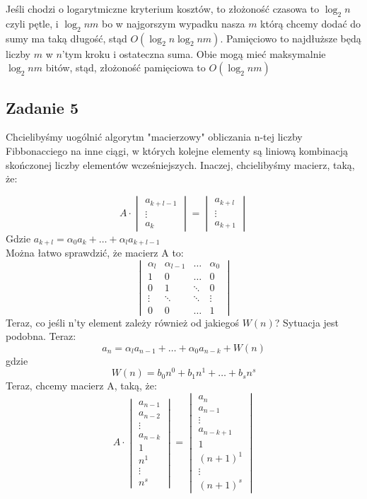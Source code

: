 \documentclass[a4paper]{article}
\begin{document}
Jeśli chodzi o logarytmiczne kryterium kosztów, to złożoność czasowa to $\log_2{n}$ czyli pętle, i $\log_2{nm}$ bo w najgorszym wypadku nasza $m$ którą chcemy dodać do sumy ma taką długość, stąd $O(\log_2{n} \log_2{nm})$. Pamięciowo to najdłuższe będą liczby $m$ w $n$'tym kroku i ostateczna suma. Obie mogą mieć maksymalnie $\log_2{nm}$ bitów, stąd, złożoność pamięciowa to $O(\log_2{nm})$

\clearpage
\subsection*{Zadanie 5}
Chcielibyśmy uogólnić algorytm "macierzowy" obliczania n-tej liczby Fibbonacciego na inne ciągi, w których kolejne elementy są liniową kombinacją skończonej liczby elementów wcześniejszych. Inaczej, chcielibyśmy macierz, taką, że:

$$ A\cdot \begin{vmatrix}
a_{k+l-1}\\
\vdots\\
a_k
\end{vmatrix} = \begin{vmatrix}
a_{k+l}\\
\vdots\\
a_{k+1}
\end{vmatrix}$$
Gdzie $a_{k+l}=\alpha_0 a_k + \dots + \alpha_{l} a_{k+l-1}$\\
Można łatwo sprawdzić, że macierz A to:\\

$$\begin{vmatrix}
\alpha_l & \alpha_{l-1} & \dots & \alpha_0\\
1 & 0& \dots & 0\\
0 & 1 & \ddots & 0\\
\vdots &\ddots & \ddots & \vdots\\
0 & 0 & \dots & 1
\end{vmatrix} $$
\clearpage
Teraz, co jeśli n'ty element zależy również od jakiegoś $W(n)$? Sytuacja jest podobna. Teraz:
$$a_n = \alpha_{l} a_{n-1} + \dots + \alpha_{0} a_{n-k} + W(n)$$ gdzie $$W(n)=b_0 n^0 + b_1 n^1 + \dots + b_s n^s$$
Teraz, chcemy macierz A, taką, że:
$$ A\cdot \begin{vmatrix}
a_{n-1}\\
a_{n-2}\\
\vdots\\
a_{n-k}\\
1\\
n^1\\
\vdots\\
n^s
\end{vmatrix} = \begin{vmatrix}
a_{n}\\
a_{n-1}\\
\vdots\\
a_{n-k+1}\\
1\\
(n+1)^1\\
\vdots\\
(n+1)^s
\end{vmatrix}$$
\end{document}
